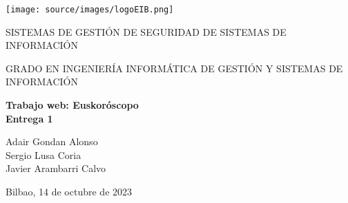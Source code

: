 
\begin{center}

\texttt{[image: source/images/logoEIB.png]} 




\vspace*{2cm}
\begin{Large}
SISTEMAS DE GESTIÓN DE SEGURIDAD DE SISTEMAS DE INFORMACIÓN
\end{Large}

\vspace*{1cm}
\begin{Large}
GRADO EN INGENIERÍA INFORMÁTICA DE GESTIÓN Y SISTEMAS DE INFORMACIÓN
\end{Large}

\vspace*{2.5cm}

\textbf{\huge \bigskip Trabajo web: Euskoróscopo\\Entrega 1} %


\vspace*{1.5cm}

{\Large Adair Gondan Alonso\\Sergio Lusa Coria\\Javier Arambarri Calvo} %



\vspace*{1.5cm}

Bilbao, 14 de octubre de 2023\\


\end{center}